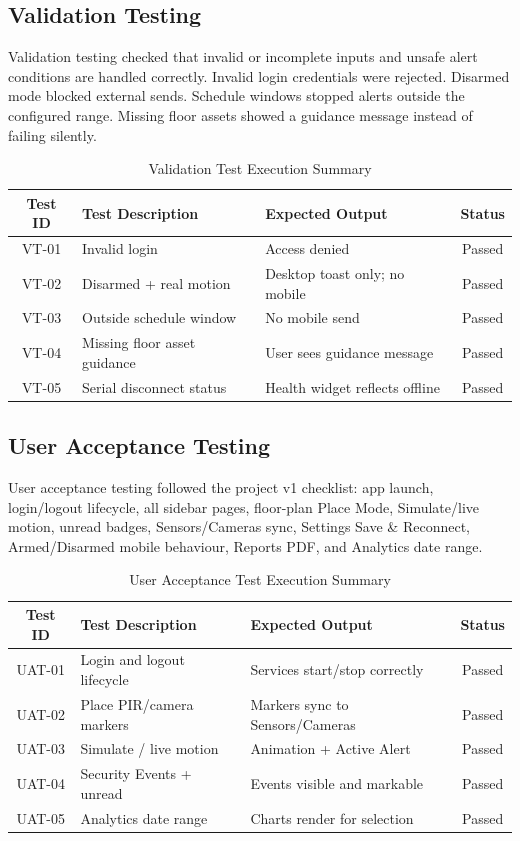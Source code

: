 \documentclass[12pt,a4paper]{report}
\begin{document}
\subsection{Validation Testing}

Validation testing checked that invalid or incomplete inputs and unsafe alert conditions are handled correctly. Invalid login credentials were rejected. Disarmed mode blocked external sends. Schedule windows stopped alerts outside the configured range. Missing floor assets showed a guidance message instead of failing silently.

\begin{table}[H]
\centering
\label{tab:validation-testing}
\begin{tabular}{|c|p{5cm}|p{5cm}|c|}
\hline
\textbf{Test ID} & \textbf{Test Description} & \textbf{Expected Output} & \textbf{Status} \\
\hline
VT-01 & Invalid login & Access denied & Passed \\
\hline
VT-02 & Disarmed + real motion & Desktop toast only; no mobile & Passed \\
\hline
VT-03 & Outside schedule window & No mobile send & Passed \\
\hline
VT-04 & Missing floor asset guidance & User sees guidance message & Passed \\
\hline
VT-05 & Serial disconnect status & Health widget reflects offline & Passed \\
\hline
\end{tabular}
\caption{Validation Test Execution Summary}
\end{table}

\subsection{User Acceptance Testing}

User acceptance testing followed the project v1 checklist: app launch, login/logout lifecycle, all sidebar pages, floor-plan Place Mode, Simulate/live motion, unread badges, Sensors/Cameras sync, Settings Save \& Reconnect, Armed/Disarmed mobile behaviour, Reports PDF, and Analytics date range.

\begin{table}[H]
\centering
\label{tab:uat}
\begin{tabular}{|c|p{5cm}|p{5cm}|c|}
\hline
\textbf{Test ID} & \textbf{Test Description} & \textbf{Expected Output} & \textbf{Status} \\
\hline
UAT-01 & Login and logout lifecycle & Services start/stop correctly & Passed \\
\hline
UAT-02 & Place PIR/camera markers & Markers sync to Sensors/Cameras & Passed \\
\hline
UAT-03 & Simulate / live motion & Animation + Active Alert & Passed \\
\hline
UAT-04 & Security Events + unread & Events visible and markable & Passed \\
\hline
UAT-05 & Analytics date range & Charts render for selection & Passed \\
\hline
\end{tabular}
\caption{User Acceptance Test Execution Summary}
\end{table}
\end{document}
